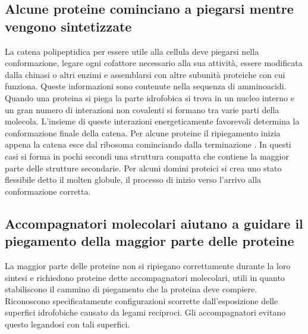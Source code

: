 \subsection{Alcune proteine cominciano a piegarsi mentre vengono sintetizzate}
La catena polipeptidica per essere utile alla cellula deve piegarsi nella conformazione, legare ogni cofattore necessario alla sua attivit\`a, essere modificata dalla chinasi o altri 
enzimi e assemblarsi con altre subunit\`a proteiche con cui funziona. Queste informazioni sono contenute nella sequenza di amminoacidi. Quando una proteina si piega la parte idrofobica
si trova in un nucleo interno e un gran numero di interazioni non covalenti si formano tra varie parti della molecola. L'insieme di queste interazioni energeticamente favorevoli determina
la conformazione finale della catena. Per alcune proteine il ripiegamento inizia appena la catena esce dal ribosoma cominciando dalla terminazione . In questi casi si forma in 
pochi secondi una struttura compatta che contiene la maggior parte delle strutture secondarie. Per alcuni domini proteici si crea uno stato flessibile detto il molten globule, il 
processo di inizio verso l'arrivo alla conformazione corretta. 
\subsection{Accompagnatori molecolari aiutano a guidare il piegamento della maggior parte delle proteine}
La maggior parte delle proteine non si ripiegano correttamente durante la loro sintesi e richiedono proteine dette accompagnatori molecolari, utili in quanto stabiliscono il cammino
di piegamento che la proteina deve compiere. Riconoscono specificatamente configurazioni scorrette dall'esposizione delle superfici idrofobiche causato da legami reciproci. Gli 
accompagnatori evitano questo legandosi con tali superfici.
